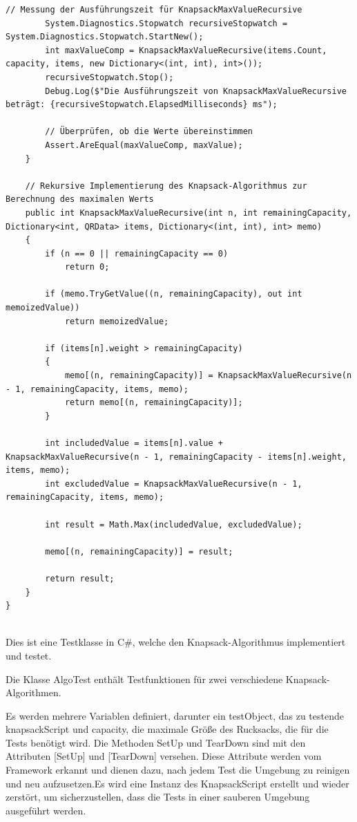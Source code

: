 \begin{lstlisting}[style=csharp, caption={Inventar füllen}, label=code:invFül_PSV]
        // Messung der Ausführungszeit für KnapsackMaxValueRecursive
        System.Diagnostics.Stopwatch recursiveStopwatch = System.Diagnostics.Stopwatch.StartNew();
        int maxValueComp = KnapsackMaxValueRecursive(items.Count, capacity, items, new Dictionary<(int, int), int>());
        recursiveStopwatch.Stop();
        Debug.Log($"Die Ausführungszeit von KnapsackMaxValueRecursive beträgt: {recursiveStopwatch.ElapsedMilliseconds} ms");

        // Überprüfen, ob die Werte übereinstimmen
        Assert.AreEqual(maxValueComp, maxValue);
    }

    // Rekursive Implementierung des Knapsack-Algorithmus zur Berechnung des maximalen Werts
    public int KnapsackMaxValueRecursive(int n, int remainingCapacity, Dictionary<int, QRData> items, Dictionary<(int, int), int> memo)
    {
        if (n == 0 || remainingCapacity == 0)
            return 0;

        if (memo.TryGetValue((n, remainingCapacity), out int memoizedValue))
            return memoizedValue;

        if (items[n].weight > remainingCapacity)
        {
            memo[(n, remainingCapacity)] = KnapsackMaxValueRecursive(n - 1, remainingCapacity, items, memo);
            return memo[(n, remainingCapacity)];
        }

        int includedValue = items[n].value + KnapsackMaxValueRecursive(n - 1, remainingCapacity - items[n].weight, items, memo);
        int excludedValue = KnapsackMaxValueRecursive(n - 1, remainingCapacity, items, memo);

        int result = Math.Max(includedValue, excludedValue);

        memo[(n, remainingCapacity)] = result;

        return result;
    }
}
\end{lstlisting}\\
Dies ist eine Testklasse in C#, welche den Knapsack-Algorithmus implementiert und testet.

Die Klasse AlgoTest enthält Testfunktionen für zwei verschiedene Knapsack-Algorithmen.

Es werden mehrere Variablen definiert, darunter ein testObject, das zu testende knapsackScript und capacity, die maximale
Größe des Rucksacks, die für die Tests benötigt wird. Die Methoden SetUp und TearDown sind mit den Attributen [SetUp] und
[TearDown] versehen. Diese Attribute werden vom Framework erkannt und dienen dazu, nach jedem Test die Umgebung zu reinigen
und neu aufzusetzen.Es wird eine Instanz des KnapsackScript erstellt und wieder zerstört, um sicherzustellen, dass die
Tests in einer sauberen Umgebung ausgeführt werden.

